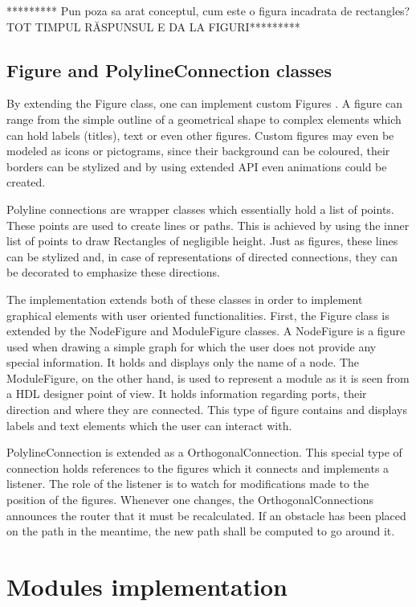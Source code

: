 ********* Pun poza sa arat conceptul, cum este o figura incadrata de rectangles? TOT TIMPUL RĂSPUNSUL E DA LA FIGURI********* 

\subsection{Figure and PolylineConnection classes}

By extending the Figure class, one can implement custom Figures . A figure can 
range from the simple outline of a geometrical shape to complex elements which can hold labels (titles), text 
or even other figures. Custom figures may even be modeled as icons or pictograms, since their background can be 
coloured, their borders can be stylized and by using extended API even animations could be created.

Polyline connections are wrapper classes which essentially hold a list of points. These points are used to create 
lines or paths. This is achieved by using the inner list of points to draw Rectangles of negligible height. Just 
as figures, these lines can be stylized and, in case of representations of directed connections, they can be 
decorated to emphasize these directions.

The implementation extends both of these classes in order to implement graphical elements with user oriented 
functionalities. First, the Figure class is extended by the NodeFigure and ModuleFigure classes. A NodeFigure 
is a figure used when drawing a simple graph for which the user does not provide any special information.
It holds and displays only the name of a node. The ModuleFigure, on the other hand, is used to represent a 
module as it is seen from a HDL designer point of view. It holds information regarding ports, their direction 
and where they are connected. This type of figure contains and displays labels and text elements which the user 
can interact with.

PolylineConnection is extended as a OrthogonalConnection. This special type of connection holds references to the 
figures which it connects and implements a listener. The role of the listener is to watch for modifications made 
to the position of the figures. Whenever one changes, the OrthogonalConnections announces the router that it 
must be recalculated. If an obstacle has been placed on the path in the meantime, the new path shall be computed 
to go around it.

\section{Modules implementation}

